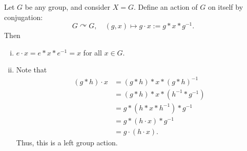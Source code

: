 \documentclass[11pt,openany]{article}
\begin{document}
\begin{example*}
Let \( G \) be any group, and consider \( X = G \). Define an action of \( G \) on itself by conjugation: \[
G \curvearrowright G, \quad (g, x) \mapsto g \cdot x := g\ast x\ast g^{-1}.
\] Then \begin{enumerate}[(i)]
	\item \( e \cdot x = e\ast x\ast e^{-1} = x \) for all \( x \in G \).
	\item Note that \begin{align*}
		(g\ast h) \cdot x &= (g\ast h)\ast x\ast (g\ast h)^{-1} \\
		&= (g\ast h)\ast x\ast (h^{-1}\ast g^{-1})\\
		&= g\ast (h\ast x\ast h^{-1})\ast g^{-1}\\
		&= g\ast (h\cdot x)\ast g^{-1}\\
		&=g \cdot (h \cdot x).
	\end{align*} Thus, this is a left group action.
\end{enumerate}
\end{example*}
\end{document}
